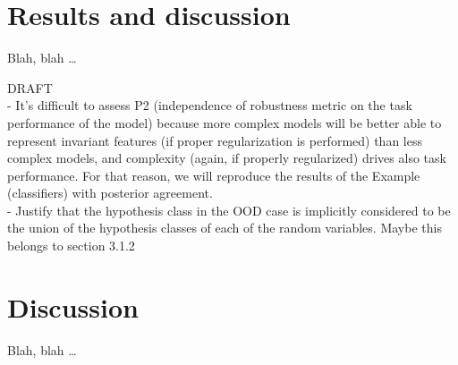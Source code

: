 \chapter{Results and discussion}\label{sec:something}

Blah, blah \dots

DRAFT \\

- It's difficult to assess P2 (independence of robustness metric on the task
performance of the model) because more complex models will be better able
to represent invariant features (if proper regularization is performed) than
less complex models, and complexity (again, if properly regularized) drives also
task performance. For that reason, we will reproduce the results of the 
Example (classifiers) with posterior agreement. \\

- Justify that the hypothesis class in the OOD case is implicitly
considered to be the union of the hypothesis classes of each of
the random variables. Maybe this belongs to section 3.1.2 \\

 \cleardoublepage


\chapter{Discussion}\label{sec:again_something}

Blah, blah \dots

 \cleardoublepage
